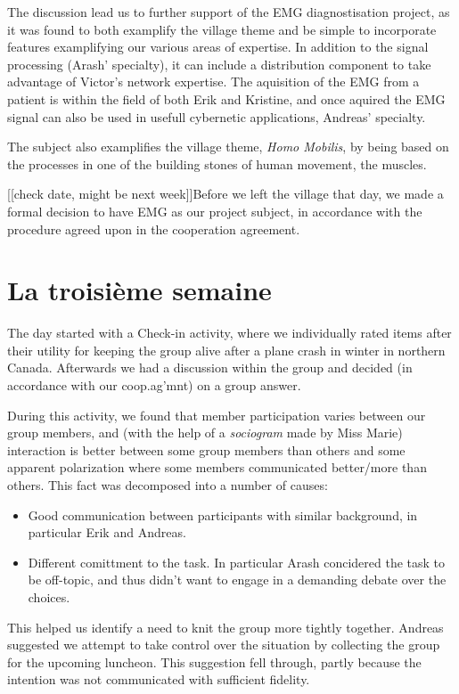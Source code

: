 \documentclass[a4paper, oneside, fleqn, halfparskip]{scrartcl}
\begin{document}
The discussion lead us to further support of the EMG diagnostisation project, as it was found to both examplify the village theme and be simple to incorporate features examplifying our various areas of expertise. In addition to the signal processing (Arash' specialty), it can include a distribution component to take advantage of Victor's network expertise. The aquisition of the EMG from a patient is within the field of both Erik and Kristine, and once aquired the EMG signal can also be used in usefull cybernetic applications, Andreas' specialty. 

The subject also examplifies the village theme, \emph{Homo Mobilis}, by being based on the processes in one of the building stones of human movement, the muscles. 

[[check date, might be next week]]Before we left the village that day, we made a formal decision to have EMG as our project subject, in accordance with the procedure agreed upon in the cooperation agreement.

\section{La troisième semaine}
The day started with a Check-in activity, where we individually rated items after their utility for keeping the group alive after a plane crash in winter in northern Canada. Afterwards we had a discussion within the group and decided (in accordance with our coop.ag'mnt) on a group answer. 

During this activity, we found that member participation varies between our group members, and (with the help of a \emph{sociogram} made by Miss Marie) interaction is better between some group members than others and some apparent polarization where some members communicated better/more than others. This fact was decomposed into a number of causes:
\begin{itemize}
  \item Good communication between participants with similar background, in particular Erik and Andreas.
  \item Different comittment to the task. In particular Arash concidered the task to be off-topic, and thus didn't want to engage in a demanding debate over the choices.
\end{itemize}
This helped us identify a need to knit the group more tightly together. Andreas suggested we attempt to take control over the situation by collecting the group for the upcoming luncheon. This suggestion fell through, partly because the intention was not communicated with sufficient fidelity.
\end{document}
